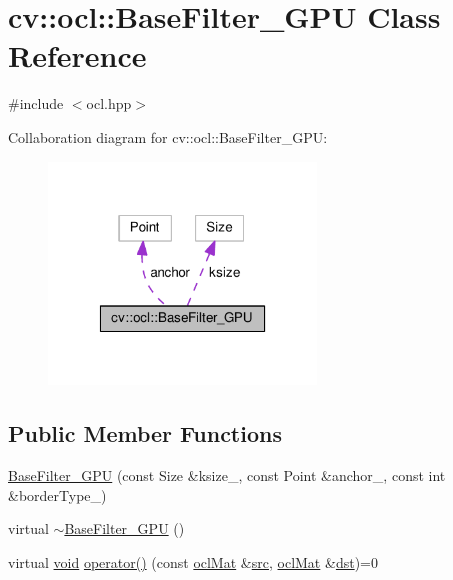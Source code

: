 \hypertarget{classcv_1_1ocl_1_1BaseFilter__GPU}{\section{cv\-:\-:ocl\-:\-:Base\-Filter\-\_\-\-G\-P\-U Class Reference}
\label{classcv_1_1ocl_1_1BaseFilter__GPU}
}


{\ttfamily \#include $<$ocl.\-hpp$>$}



Collaboration diagram for cv\-:\-:ocl\-:\-:Base\-Filter\-\_\-\-G\-P\-U\-:\nopagebreak
\begin{figure}[H]
\begin{center}
\leavevmode
\includegraphics[width=202pt]{classcv_1_1ocl_1_1BaseFilter__GPU__coll__graph}
\end{center}
\end{figure}
\subsection*{Public Member Functions}
\begin{DoxyCompactItemize}
\item 
\hyperlink{classcv_1_1ocl_1_1BaseFilter__GPU_a4a97862c51354ad5c1329802a70eaaf4}{Base\-Filter\-\_\-\-G\-P\-U} (const Size \&ksize\-\_\-, const Point \&anchor\-\_\-, const int \&border\-Type\-\_\-)
\item 
virtual \hyperlink{classcv_1_1ocl_1_1BaseFilter__GPU_a017be75814bf9812f2572bd15239c20b}{$\sim$\-Base\-Filter\-\_\-\-G\-P\-U} ()
\item 
virtual \hyperlink{legacy_8hpp_a8bb47f092d473522721002c86c13b94e}{void} \hyperlink{classcv_1_1ocl_1_1BaseFilter__GPU_aea82b798f3e7f6379d52a5d115c4cf4a}{operator()} (const \hyperlink{classcv_1_1ocl_1_1oclMat}{ocl\-Mat} \&\hyperlink{legacy_8hpp_a371cd109b74033bc4366f584edd3dacc}{src}, \hyperlink{classcv_1_1ocl_1_1oclMat}{ocl\-Mat} \&\hyperlink{photo__c_8h_aed13e2a25279b24dc954073233fef7a5}{dst})=0
\end{DoxyCompactItemize}
